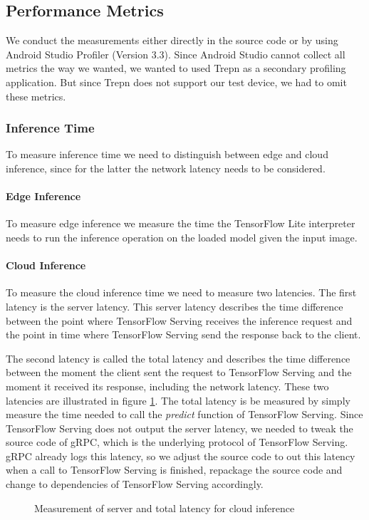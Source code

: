 \subsection{Performance Metrics}
\label{chap:insta_measurements}
We conduct the measurements either directly in the source code or by using Android Studio Profiler (Version 3.3). Since Android Studio cannot collect all metrics the way we wanted, we wanted to used Trepn as a secondary profiling application. But since Trepn does not support our test device, we had to omit these metrics.
\subsubsection{Inference Time}
To measure inference time we need to  distinguish between edge and cloud inference, since for the latter the network latency needs to be considered.
\paragraph{Edge Inference}To measure edge inference we measure the time the TensorFlow Lite interpreter needs to run the inference operation on the loaded model given the input image.
\paragraph{Cloud Inference}
To measure the cloud inference time we need to measure two latencies. The first latency is the server latency. This server latency describes the time difference between the point where TensorFlow Serving receives the inference request and the point in time where TensorFlow Serving send the response back to the client.



The second latency is called the total latency and describes the time difference between the moment the client sent the request to TensorFlow Serving and the moment it received its response, including the network latency.
These two latencies are illustrated in figure \ref{fig:serverLat}.
The total latency is be measured by simply measure the time needed to call the \emph{predict} function of TensorFlow Serving.
Since TensorFlow Serving does not output the server latency, we needed to tweak the source code of gRPC, which is the underlying protocol of TensorFlow Serving. gRPC already logs this latency, so we adjust the source code to out this latency when a call to TensorFlow Serving is finished, repackage the source code and change to dependencies of TensorFlow Serving accordingly.
\begin{figure}[H]
\centering

\caption{Measurement of server and total latency for cloud inference}
\label{fig:serverLat}
\end{figure}
